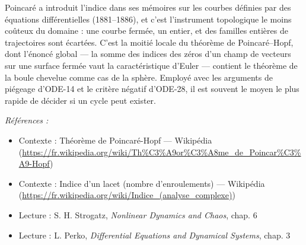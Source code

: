 \documentclass[11pt]{article}
\newenvironment{refs}{\par\small\noindent\emph{Références :}\begin{itemize}\setlength\itemsep{0pt}}{\end{itemize}\normalsize}
\begin{document}
\noindent Poincaré a introduit l'indice dans ses mémoires sur les courbes définies par
des équations différentielles (1881--1886), et c'est l'instrument topologique le moins coûteux du
domaine : une courbe fermée, un entier, et des familles entières de trajectoires sont écartées.
C'est la moitié locale du théorème de Poincaré--Hopf, dont l'énoncé global --- la somme des indices
des zéros d'un champ de vecteurs sur une surface fermée vaut la caractéristique d'Euler --- contient
le théorème de la boule chevelue comme cas de la sphère. Employé avec les arguments de piégeage
d'ODE-14 et le critère négatif d'ODE-28, il est souvent le moyen le plus rapide de décider si un
cycle peut exister.

\begin{refs}
\item Contexte : Théorème de Poincaré-Hopf --- Wikipédia (\url{https://fr.wikipedia.org/wiki/Th%C3%A9or%C3%A8me_de_Poincar%C3%A9-Hopf})
\item Contexte : Indice d'un lacet (nombre d'enroulements) --- Wikipédia (\url{https://fr.wikipedia.org/wiki/Indice_(analyse_complexe)})
\item Lecture : S. H. Strogatz, \textit{Nonlinear Dynamics and Chaos}, chap. 6
\item Lecture : L. Perko, \textit{Differential Equations and Dynamical Systems}, chap. 3
\end{refs}

\bigskip
\end{document}
